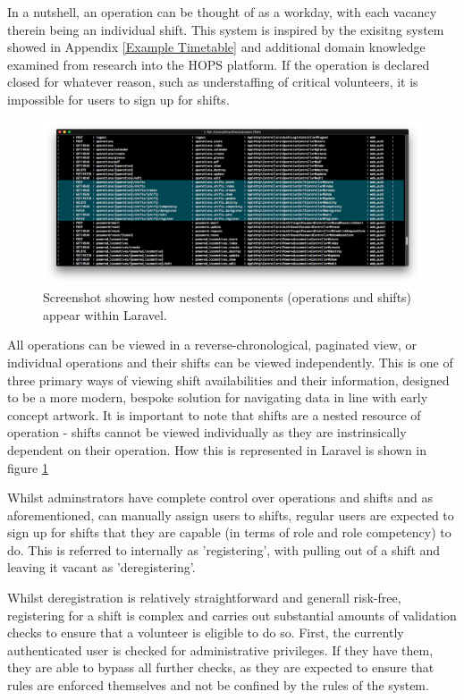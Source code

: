 In a nutshell, an operation can be thought of as a workday, with each vacancy therein being an individual shift. This system is inspired by the exisitng system showed in Appendix \ref{Example Timetable} and additional domain knowledge examined from research into the HOPS platform. \cite{Hops2} If the operation is declared closed for whatever reason, such as understaffing of critical volunteers, it is impossible for users to sign up for shifts.

\begin{figure}[!ht]
    \centering
    \includegraphics[width=1.0\textwidth]{Figures/nested-components}
    \caption{Screenshot showing how nested components (operations and shifts) appear within Laravel.}
    \label{fig:nested}
\end{figure}

All operations can be viewed in a reverse-chronological, paginated view, or individual operations and their shifts can be viewed independently. This is one of three primary ways of viewing shift availabilities and their information, designed to be a more modern, bespoke solution for navigating data in line with early concept artwork. It is important to note that shifts are a nested resource of operation - shifts cannot be viewed individually as they are instrinsically dependent on their operation. How this is represented in Laravel is shown in figure \ref{fig:nested}

Whilst adminstrators have complete control over operations and shifts and as aforementioned, can manually assign users to shifts, regular users are expected to sign up for shifts that they are capable (in terms of role and role competency) to do. This is referred to internally as 'registering', with pulling out of a shift and leaving it vacant as 'deregistering'.

Whilst deregistration is relatively straightforward and generall risk-free, registering for a shift is complex and carries out substantial amounts of validation checks to ensure that a volunteer is eligible to do so. First, the currently authenticated user is checked for administrative privileges. If they have them, they are able to bypass all further checks, as they are expected to ensure that rules are enforced themselves and not be confined by the rules of the system. 

